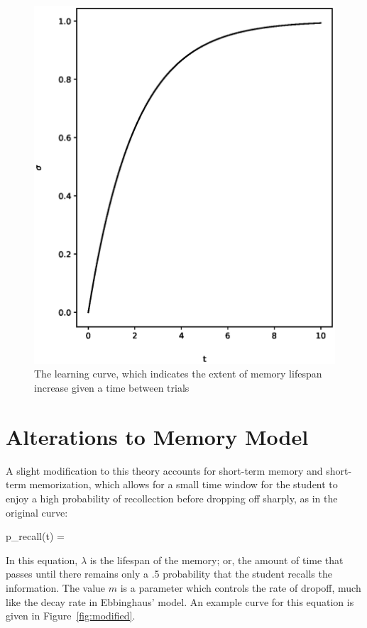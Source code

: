 \begin{figure}[p!]
 \label{fig:spacing}
 \includegraphics{fig/spacing.eps} 
 \caption{The learning curve, which indicates the extent of memory
 lifespan increase given a time between trials}
\end{figure}

\section{Alterations to Memory Model}

A slight modification to this theory accounts for short-term memory and
short-term memorization, which allows for a small time window for the student
to enjoy a high probability of recollection before dropping off sharply, as in
the original curve:

\begin{equations}
\label{eq:memory}
 p_{recall}(t) = 
\end{equations}

In this equation, $\lambda$ is the lifespan of the memory; or, the amount of
time that passes until there remains only a .5 probability that the student
recalls the information.  The value $m$ is a parameter which controls the rate
of dropoff, much like the decay rate in Ebbinghaus' model.  An example curve
for this equation is given in Figure~\ref{fig:modified}.


